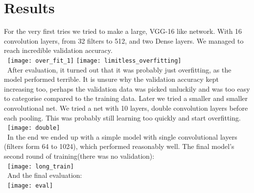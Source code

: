 \section{Results}
For the very first tries we tried to make a large, VGG-16 like network. With 16 convolution layers, from 32 filters to 512, and two Dense layers. We managed to reach incredible validation accuracy.
\\\
\texttt{[image: over\_fit\_1]}
\newline
\texttt{[image: limitless\_overfitting]}
\\\
After evaluation, it turned out that it was probably just overfitting, as the model performed terrible.  It is unsure why the validation accuracy kept increasing too, perhaps the validation data was picked unluckily and was too easy to categorise compared to the training data. 
Later we tried a smaller and smaller convolutional net. We tried a net with 10 layers, double convolution layers before each pooling. This was probably still learning too quickly and start overfitting.
\\\
\texttt{[image: double]}
\\\
In the end we ended up with a simple model with single convolutional layers (filters form 64 to 1024), which performed reasonably well.
The final model's second round of training(there was no validation):
\\\
\texttt{[image: long\_train]}
\\\
And the final evaluation:
\newline
\\\
\texttt{[image: eval]}
